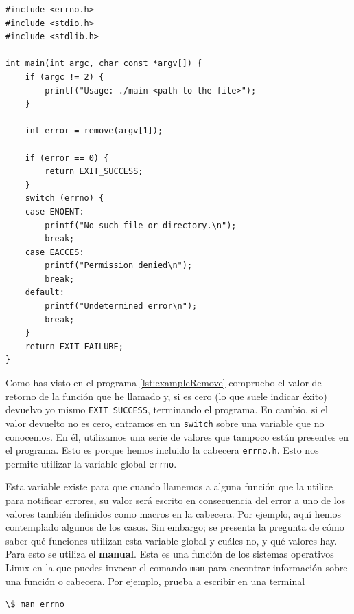 \documentclass[a4paper]{article}
\begin{document}
\noindent
\begin{minipage}[H]{\linewidth}
\mbox{}
\begin{lstlisting}[style=C,
caption={Ejemplo de programa que usa la variable \texttt{errno}},
label={lst:exampleRemove2}]
#include <errno.h>
#include <stdio.h>
#include <stdlib.h>

int main(int argc, char const *argv[]) {
    if (argc != 2) {
        printf("Usage: ./main <path to the file>");
    }

    int error = remove(argv[1]);

    if (error == 0) {
        return EXIT_SUCCESS;
    }
    switch (errno) {
    case ENOENT:
        printf("No such file or directory.\n");
        break;
    case EACCES:
        printf("Permission denied\n");
        break;
    default:
        printf("Undetermined error\n");
        break;
    }
    return EXIT_FAILURE;
}
\end{lstlisting}
\end{minipage}

Como has visto en el programa \ref{lst:exampleRemove} compruebo el valor de
retorno de la función que he llamado y, si es cero (lo que suele indicar éxito)
devuelvo yo mismo \verb!EXIT_SUCCESS!, terminando el programa. En cambio, si
el valor devuelto no es cero, entramos en un \verb!switch! sobre una variable
que no conocemos. En él, utilizamos una serie de valores que tampoco están
presentes en el programa. Esto es porque hemos incluido la cabecera
\verb!errno.h!. Esto nos permite utilizar la variable global
\verb!errno!.

Esta variable existe para que cuando llamemos a alguna función que la utilice
para notificar errores, su valor será escrito en consecuencia del error a uno
de los valores también definidos como macros en la cabecera. Por ejemplo, aquí
hemos contemplado algunos de los casos. Sin embargo; se presenta la pregunta
de cómo saber qué funciones utilizan esta variable global y cuáles no, y qué
valores hay. Para esto se utiliza el \textbf{manual}. Esta es una función de
los sistemas operativos Linux en la que puedes invocar el comando \verb!man!
para encontrar información sobre una función o cabecera. Por ejemplo, prueba
a escribir en una terminal

\noindent
\begin{minipage}[H]{\linewidth}
\mbox{}
\begin{lstlisting}[style=terminalStyle]
\$ man errno
\end{lstlisting}
\end{minipage}
\end{document}
